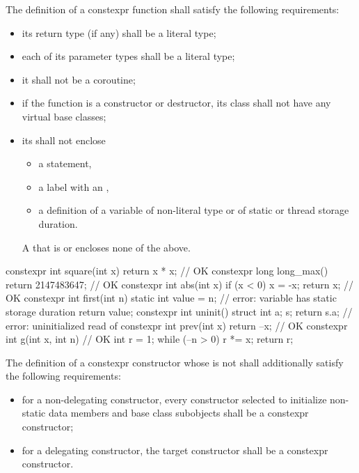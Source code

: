 \pnum
{}%
%
The definition of a constexpr function shall satisfy the following
requirements:
\begin{itemize}
\item
its return type (if any) shall be a literal type;

\item
each of its parameter types shall be a literal type;

\item
it shall not be a coroutine;

\item
if the function is a constructor or destructor,
its class shall not have any virtual base classes;

\item
its  shall not enclose
\begin{itemize}
\item a  statement,
\item a label with an ,
\item a definition of a variable
of non-literal type or
of static or thread storage duration.
\end{itemize}
\begin{note}
A  that is  or 
encloses none of the above.
\end{note}
\end{itemize}

\begin{example}
\begin{codeblock}
constexpr int square(int x)
  { return x * x; }             // OK
constexpr long long_max()
  { return 2147483647; }        // OK
constexpr int abs(int x) {
  if (x < 0)
    x = -x;
  return x;                     // OK
}
constexpr int first(int n) {
  static int value = n;         // error: variable has static storage duration
  return value;
}
constexpr int uninit() {
  struct { int a; } s;
  return s.a;                   // error: uninitialized read of 
}
constexpr int prev(int x)
  { return --x; }               // OK
constexpr int g(int x, int n) { // OK
  int r = 1;
  while (--n > 0) r *= x;
  return r;
}
\end{codeblock}
\end{example}

\pnum
{}%
The definition of a constexpr constructor
whose  is not 
shall additionally satisfy the following requirements:
\begin{itemize}

\item
for a non-delegating constructor, every constructor selected to initialize non-static
data members and base class subobjects shall be a constexpr constructor;

\item
for a delegating constructor, the target constructor shall be a constexpr
constructor.
\end{itemize}

